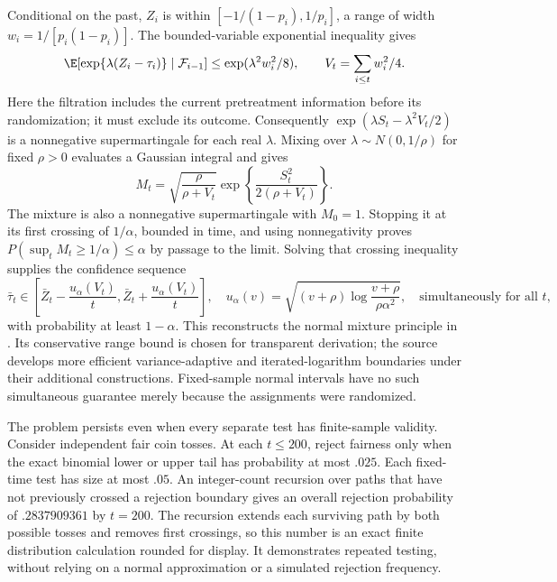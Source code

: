 Conditional on the past, $Z_i$ is within
$[-1/(1-p_i),1/p_i]$, a range of width
$w_i=1/[p_i(1-p_i)]$. The bounded-variable exponential inequality
gives
\[
 \E[\exp\{\lambda(Z_i-\tau_i)\}\mid\mathcal F_{i-1}]
       \le\exp(\lambda^2 w_i^2/8),\qquad
 V_t=\sum_{i\le t}w_i^2/4.
\]
Here the filtration includes the current pretreatment information
before its randomization; it must exclude its outcome. Consequently
$\exp(\lambda S_t-\lambda^2V_t/2)$ is a nonnegative
supermartingale for each real $\lambda$. Mixing over
$\lambda\sim N(0,1/\rho)$ for fixed $\rho>0$ evaluates a Gaussian
integral and gives
\[
 M_t=\sqrt{\frac{\rho}{\rho+V_t}}
       \exp\left\{\frac{S_t^2}{2(\rho+V_t)}\right\}.
\]
The mixture is also a nonnegative supermartingale with $M_0=1$.
Stopping it at its first crossing of $1/\alpha$, bounded in time,
and using nonnegativity proves
$P(\sup_tM_t\ge1/\alpha)\le\alpha$ by passage to the limit.
Solving that crossing inequality supplies the confidence sequence
\begin{equation}
 \bar\tau_t\in\left[\bar Z_t-\frac{u_\alpha(V_t)}{t},
                      \bar Z_t+\frac{u_\alpha(V_t)}{t}\right],\quad
 u_\alpha(v)=\sqrt{(v+\rho)\log\frac{v+\rho}{\rho\alpha^2}},
 \quad\text{simultaneously for all }t,
 \label{r3:confidence-sequence}
\end{equation}
with probability at least $1-\alpha$. This reconstructs the normal
mixture principle in \citet[Definition 1, Lemma 2 and Appendix A.3,
Proposition 5]{howard2021}. Its conservative range bound is chosen
for transparent derivation; the source develops more efficient
variance-adaptive and iterated-logarithm boundaries under their
additional constructions. Fixed-sample normal intervals have no such
simultaneous guarantee merely because the assignments were randomized.

The problem persists even when every separate test has finite-sample
validity. Consider independent fair coin tosses. At each $t\le200$,
reject fairness only when the exact binomial lower or upper tail has
probability at most $.025$. Each fixed-time test has size at most
$.05$. An integer-count recursion over paths that have not previously
crossed a rejection boundary gives an overall rejection probability
of $.2837909361$ by $t=200$. The recursion extends each surviving
path by both possible tosses and removes first crossings, so this
number is an exact finite distribution calculation rounded for display.
It demonstrates repeated testing, without relying on a normal
approximation or a simulated rejection frequency.

